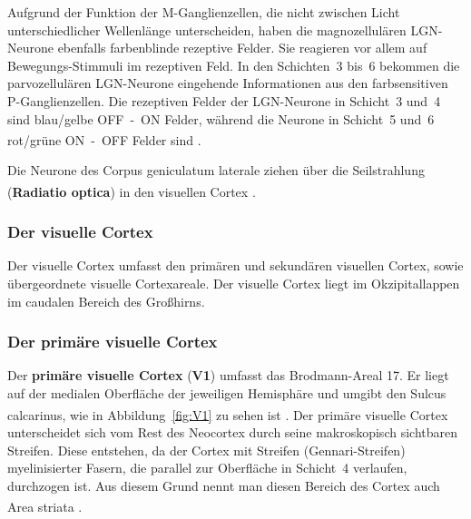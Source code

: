 \documentclass[12pt,a4paper,pdftex]{article}
\begin{document}
Aufgrund der Funktion der M-Ganglienzellen, die nicht zwischen Licht unterschiedlicher Wellenlänge unterscheiden, haben die magnozellulären LGN-Neurone ebenfalls farbenblinde rezeptive Felder. Sie reagieren vor allem auf Bewegungs-Stimmuli im rezeptiven Feld. In den Schichten~3 bis~6 bekommen die parvozellulären LGN-Neurone eingehende Informationen aus den farbsensitiven P-Ganglienzellen. Die rezeptiven Felder der LGN-Neurone in Schicht~3 und~4 sind blau/gelbe OFF~-~ON Felder, während die Neurone in Schicht~5 und~6 rot/grüne ON~-~OFF Felder sind \textsuperscript{\cite[18]{smith2008biology}}.

Die Neurone des Corpus geniculatum laterale ziehen über die Seilstrahlung (\textbf{Radiatio optica})  in den visuellen Cortex \textsuperscript{\cite[8.1]{trepel2011neuroanatomie}}.


\subsubsection*{Der visuelle Cortex}

Der visuelle Cortex umfasst den primären und sekundären visuellen Cortex, sowie übergeordnete visuelle Cortexareale. Der visuelle Cortex liegt im Okzipitallappen im caudalen Bereich des Großhirns. 


\subsubsection*{Der primäre visuelle Cortex}

Der \textbf{primäre visuelle Cortex} (\textbf{V1})  umfasst das Brodmann-Areal 17. Er liegt auf der medialen Oberfläche der jeweiligen Hemisphäre und umgibt den Sulcus calcarinus, wie in Abbildung~\ref{fig:V1} zu sehen ist \textsuperscript{\cite[10]{neurowissenschaften_baer}}.
Der primäre visuelle Cortex unterscheidet sich vom Rest des Neocortex durch seine makroskopisch sichtbaren Streifen. Diese entstehen, da der Cortex mit Streifen (Gennari-Streifen) myelinisierter Fasern, die parallel zur Oberfläche in Schicht~4 verlaufen, durchzogen ist. Aus diesem Grund nennt man diesen Bereich des Cortex auch Area striata \textsuperscript{\cite[18]{smith2008biology}}.
\end{document}
